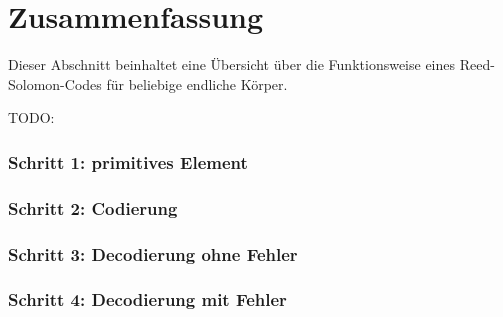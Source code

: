 \section{Zusammenfassung 
	\label{reedsolomon:section:zf}}
Dieser Abschnitt beinhaltet eine Übersicht über die Funktionsweise eines Reed-Solomon-Codes für beliebige endliche Körper.

TODO:

\subsubsection{Schritt 1: primitives Element}

\subsubsection{Schritt 2: Codierung}

\subsubsection{Schritt 3: Decodierung ohne Fehler}

\subsubsection{Schritt 4: Decodierung mit Fehler}

